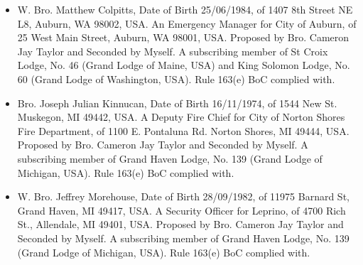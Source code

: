 \documentclass{lodgebrand}
\begin{document}
\begin{itemize}
  \item W. Bro. Matthew Colpitts, Date of Birth 25/06/1984, of 1407 8th Street NE L8, Auburn, WA 98002, USA. An Emergency Manager for City of Auburn, of 25 West Main Street, Auburn, WA 98001, USA. Proposed by Bro. Cameron Jay Taylor and Seconded by Myself. A subscribing member of St Croix Lodge, No. 46 (Grand Lodge of Maine, USA) and King Solomon Lodge, No. 60 (Grand Lodge of Washington, USA). Rule 163(e) BoC complied with.
  \item Bro. Joseph Julian Kinnucan, Date of Birth 16/11/1974, of 1544 New St. Muskegon, MI 49442, USA. A Deputy Fire Chief for City of Norton Shores Fire Department, of 1100 E. Pontaluna Rd. Norton Shores, MI 49444, USA. Proposed by Bro. Cameron Jay Taylor and Seconded by Myself. A subscribing member of Grand Haven Lodge, No. 139 (Grand Lodge of Michigan, USA). Rule 163(e) BoC complied with.
  \item W. Bro. Jeffrey Morehouse, Date of Birth 28/09/1982, of 11975 Barnard St, Grand Haven, MI 49417, USA. A Security Officer for Leprino, of 4700 Rich St., Allendale, MI 49401, USA. Proposed by Bro. Cameron Jay Taylor and Seconded by Myself. A subscribing member of Grand Haven Lodge, No. 139 (Grand Lodge of Michigan, USA). Rule 163(e) BoC complied with.
\end{itemize}









\end{document}
